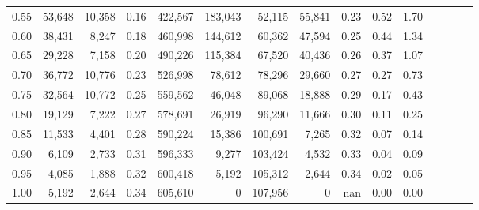 \begin{tabular}{rrrcrrrrrrrrrrr}
0.55 &  53,648 &  10,358 &                                       0.16 &  422,567 &  183,043 &   52,115 &   55,841 &  0.23 &  0.52 &                         1.70 \\
0.60 &  38,431 &   8,247 &                                       0.18 &  460,998 &  144,612 &   60,362 &   47,594 &  0.25 &  0.44 &                         1.34 \\
0.65 &  29,228 &   7,158 &                                       0.20 &  490,226 &  115,384 &   67,520 &   40,436 &  0.26 &  0.37 &                         1.07 \\
0.70 &  36,772 &  10,776 &                                       0.23 &  526,998 &   78,612 &   78,296 &   29,660 &  0.27 &  0.27 &                         0.73 \\
0.75 &  32,564 &  10,772 &                                       0.25 &  559,562 &   46,048 &   89,068 &   18,888 &  0.29 &  0.17 &                         0.43 \\
0.80 &  19,129 &   7,222 &                                       0.27 &  578,691 &   26,919 &   96,290 &   11,666 &  0.30 &  0.11 &                         0.25 \\
0.85 &  11,533 &   4,401 &                                       0.28 &  590,224 &   15,386 &  100,691 &    7,265 &  0.32 &  0.07 &                         0.14 \\
0.90 &   6,109 &   2,733 &                                       0.31 &  596,333 &    9,277 &  103,424 &    4,532 &  0.33 &  0.04 &                         0.09 \\
0.95 &   4,085 &   1,888 &                                       0.32 &  600,418 &    5,192 &  105,312 &    2,644 &  0.34 &  0.02 &                         0.05 \\
1.00 &   5,192 &   2,644 &                                       0.34 &  605,610 &        0 &  107,956 &        0 &   nan &  0.00 &                         0.00 \\
\bottomrule
\end{tabular}
